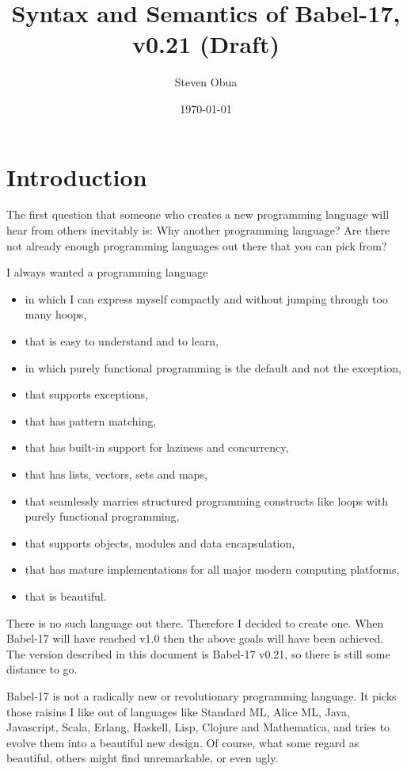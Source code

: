 \documentclass[11pt]{amsart}
\title{Syntax and Semantics of Babel-17, v0.21 (Draft)}
\author{Steven Obua}
\date{\today}
\begin{document}


\maketitle

\tableofcontents


\section{Introduction}
The first question that someone who creates a new programming language will  hear from others inevitably is: Why another programming language? Are there not already enough programming languages out there that you can pick from?

I always wanted a programming language 
\begin{itemize}
\item in which I can express myself compactly and without jumping through too many hoops, 
\item that is easy to understand and to learn,
\item in which purely functional programming is the default and not the exception,
\item that supports exceptions,
\item that has pattern matching,
\item that has built-in support for laziness and concurrency,
\item that has lists, vectors, sets and maps,
\item that seamlessly marries structured programming constructs like loops with purely functional programming,
\item that supports objects, modules and data encapsulation,
\item that has mature implementations for all major modern computing platforms,
\item that is beautiful.
\end{itemize}
There is no such language out there. Therefore I decided to create one. When Babel-17 will have reached v1.0 then the above goals will have been achieved. The version described in this document is Babel-17 v0.21, so there is still some distance to go. 

Babel-17 is not a radically new or revolutionary programming language. It picks those raisins I like out of languages like Standard ML, Alice ML, Java, Javascript, Scala, Erlang, Haskell, Lisp, Clojure and Mathematica, and tries to evolve them into a beautiful new design. Of course, what some regard as beautiful, others might find unremarkable, or even ugly.
\end{document}
